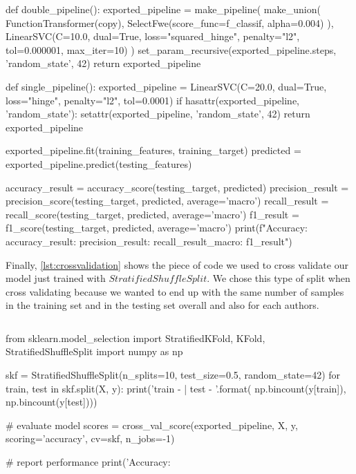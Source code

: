 \begin{lstlisting}[frame=none,caption={Training SVM model and retrieve score metrics.},captionpos=b,label=lst:train_svm]
\end{lstlisting}
\begin{python}	
	def double_pipeline():
		exported_pipeline = make_pipeline(
		make_union(
		FunctionTransformer(copy),
		SelectFwe(score_func=f_classif, alpha=0.004)
		),
		LinearSVC(C=10.0, dual=True, loss="squared_hinge", penalty="l2", tol=0.000001, max_iter=10)
		)
		set_param_recursive(exported_pipeline.steps, 'random_state', 42)
		return exported_pipeline
	
	def single_pipeline():
		exported_pipeline = LinearSVC(C=20.0, dual=True, loss="hinge", penalty="l2", tol=0.0001)
		if hasattr(exported_pipeline, 'random_state'):
			setattr(exported_pipeline, 'random_state', 42)
		return exported_pipeline
	
	exported_pipeline.fit(training_features, training_target)
	predicted = exported_pipeline.predict(testing_features)
	
	accuracy_result = accuracy_score(testing_target, predicted)
	precision_result = precision_score(testing_target, predicted, average='macro')
	recall_result = recall_score(testing_target, predicted, average='macro')
	f1_result = f1_score(testing_target, predicted, average='macro')
	print(f"Accuracy: {accuracy_result}\nPrecision: {precision_result}\nRecall: {recall_result}_macro: {f1_result}")
\end{python}

Finally, \autoref{lst:crossvalidation} shows the piece of code we used to cross validate our model just trained with $StratifiedShuffleSplit$. We chose this type of split when cross validating because we wanted to end up with the same number of samples in the training set and in the testing set overall and also for each authors.

\begin{lstlisting}[frame=none,caption={Cross validation for balanced class.},captionpos=b,label=lst:crossvalidation]
\end{lstlisting}
\begin{python}	
	from sklearn.model_selection import StratifiedKFold, KFold, StratifiedShuffleSplit
	import numpy as np
	
	skf = StratifiedShuffleSplit(n_splits=10, test_size=0.5, random_state=42)
	for train, test in skf.split(X, y):
		print('train -  {}   |   test -  {}'.format(
		np.bincount(y[train]), np.bincount(y[test])))
	
	
	# evaluate model
	scores = cross_val_score(exported_pipeline, X, y, scoring='accuracy', cv=skf, n_jobs=-1)
	
	# report performance
	print('Accuracy: %
\end{python}


